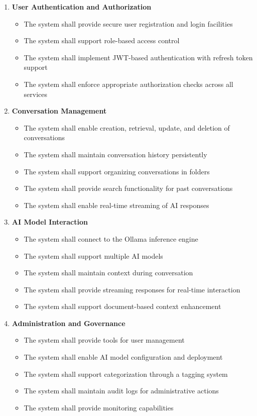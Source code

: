 \begin{enumerate}
   \item \textbf{User Authentication and Authorization}
   \begin{itemize}
      \item The system shall provide secure user registration and login facilities
      \item The system shall support role-based access control
      \item The system shall implement JWT-based authentication with refresh token support
      \item The system shall enforce appropriate authorization checks across all services
   \end{itemize}

   \item \textbf{Conversation Management}
   \begin{itemize}
      \item The system shall enable creation, retrieval, update, and deletion of conversations
      \item The system shall maintain conversation history persistently
      \item The system shall support organizing conversations in folders
      \item The system shall provide search functionality for past conversations
      \item The system shall enable real-time streaming of AI responses
   \end{itemize}

   \item \textbf{AI Model Interaction}
   \begin{itemize}
      \item The system shall connect to the Ollama inference engine
      \item The system shall support multiple AI models
      \item The system shall maintain context during conversation
      \item The system shall provide streaming responses for real-time interaction
      \item The system shall support document-based context enhancement
   \end{itemize}

   \item \textbf{Administration and Governance}
   \begin{itemize}
      \item The system shall provide tools for user management
      \item The system shall enable AI model configuration and deployment
      \item The system shall support categorization through a tagging system
      \item The system shall maintain audit logs for administrative actions
      \item The system shall provide monitoring capabilities
   \end{itemize}


\end{enumerate}
